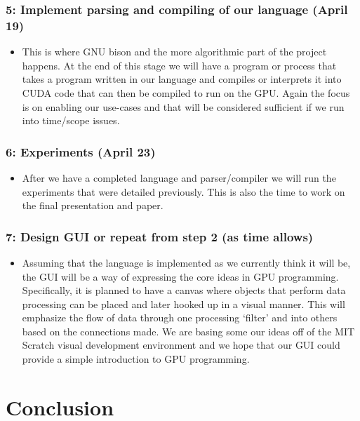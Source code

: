 \documentclass{article}
\begin{document}
\subsubsection*{5: Implement parsing and compiling of our language (April 19)}
\begin{itemize}  
  \item This is where GNU bison and the more algorithmic part of the project happens. At the end of this stage we will have a program or process that takes a program written in our language and compiles or interprets it into CUDA code that can then be compiled to run on the GPU. Again the focus is on enabling our use-cases and that will be considered sufficient if we run into time/scope issues.
\end{itemize}

\subsubsection*{6: Experiments (April 23)}
\begin{itemize}
  \item After we have a completed language and parser/compiler we will run the experiments that were detailed previously. This is also the time to work on the final presentation and paper. 
\end{itemize}

\subsubsection*{7: Design GUI or repeat from step 2 (as time allows)}
\begin{itemize}
  \item Assuming that the language is implemented as we currently think it will be, the GUI will be a way of expressing the core ideas in GPU programming. Specifically, it is planned to have a canvas where objects that perform data processing can be placed and later hooked up in a visual manner. This will emphasize the flow of data through one processing `filter' and into others based on the connections made. We are basing some our ideas off of the MIT Scratch visual development environment and we hope that our GUI could provide a simple introduction to GPU programming.
\end{itemize}

\section{Conclusion}
\end{document}
